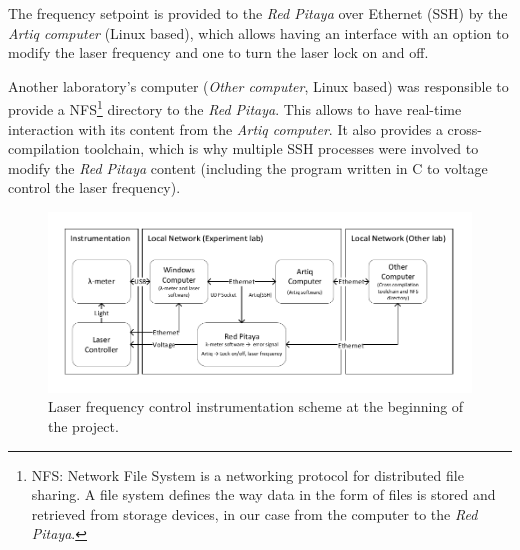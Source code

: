 \documentclass[a4paper,12pt]{article}
\begin{document}
The frequency setpoint is provided to the \textit{Red Pitaya} over Ethernet (SSH) by the \textit{Artiq computer} (Linux based), which allows having an interface with an option to modify the laser frequency and one to turn the laser lock on and off.

Another laboratory's computer (\textit{Other computer}, Linux based) was responsible to provide a NFS\footnote{NFS: Network File System is a networking protocol for distributed file sharing. A file system defines the way data in the form of files is stored and retrieved from storage devices, in our case from the computer to the \textit{Red Pitaya}.} directory to the \textit{Red Pitaya}. This allows to have real-time interaction with its content from the \textit{Artiq computer}. It also provides a cross-compilation toolchain, which is why multiple SSH processes were involved to modify the \textit{Red Pitaya} content (including the program written in C to voltage control the laser frequency).

\begin{figure}[!h]
    \centering
    \includegraphics[width=\textwidth]{Images/schematic_before.pdf}
    \captionsetup{justification=centering}
    \caption{Laser frequency control instrumentation scheme at the beginning of the project.}
    \label{fig:schematic}
\end{figure}
\end{document}
